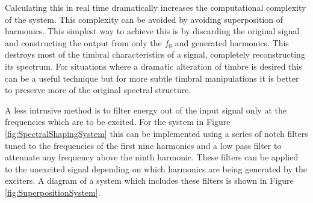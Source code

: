 		Calculating this in real time dramatically increases the computational complexity of the system. This
		complexity can be avoided by avoiding superposition of harmonics. This simplest way to achieve this is by
		discarding the original signal and constructing the output from only the $f_{0}$ and generated harmonics.
		This destroys most of the timbral characteristics of a signal, completely reconstructing its spectrum. For
		situations where a dramatic alteration of timbre is desired this can be a useful technique but for more
		subtle timbral manipulations it is better to preserve more of the original spectral structure.

		A less intrusive method is to filter energy out of the input signal only at the frequencies which are to be
		excited. For the system in Figure \ref{fig:SpectralShapingSystem} this can be implemented using a series of
		notch filters tuned to the frequencies of the first nine harmonics and a low pass filter to attenuate any
		frequency above the ninth harmonic. These filters can be applied to the unexcited signal depending on which
		harmonics are being generated by the exciters. A diagram of a system which includes these filters is shown
		in Figure \ref{fig:SuperpositionSystem}.

